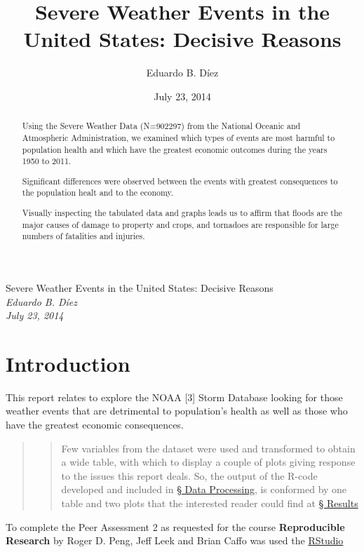 \documentclass[12pt,spanish, american,b4paper, onecolumn, lmargin=1cm, rmargin=1cm, tmargin=1cm, bmargin=2cm,]{article}
\title{Severe Weather Events in the United States: \newline{} Decisive Reasons}
\author{Eduardo B. Díez}
\date{July 23, 2014}
\begin{document}
\begin{center}
\huge Severe Weather Events in the United States: \newline{} Decisive Reasons \\[0.2cm]
\large \emph{Eduardo B. Díez}\\[0.1cm]
\large \emph{July 23, 2014} \\
\normalsize
\end{center}

\renewcommand{\abstractname}{Synopsis}
\begin{abstract}
Using the Severe Weather Data (N=902297) from the National Oceanic and
Atmospheric Administration, we examined which types of events are most
harmful to population health and which have the greatest economic
outcomes during the years 1950 to 2011.

Significant differences were observed between the events with greatest
consequences to the population healt and to the economy.

Visually inspecting the tabulated data and graphs leads us to affirm
that floods are the major causes of damage to property and crops, and
tornadoes are responsible for large numbers of fatalities and injuries.
\end{abstract}

\section{Introduction}\label{introduction}

This report relates to explore the NOAA {[}3{]} Storm Database looking
for those weather events that are detrimental to population's health as
well as those who have the greatest economic consequences.

\begin{quote}
\begin{quote}
Few variables from the dataset were used and transformed to obtain a
wide table, with which to display a couple of plots giving response to
the issues this report deals. So, the output of the R-code developed and
included in \hyperref[datapro]{§ Data Processing}, is conformed by one
table and two plots that the interested reader could find at
\hyperref[results]{§ Results}
\end{quote}
\end{quote}

To complete the Peer Assessment 2 as requested for the course
\textbf{Reproducible Research} by Roger D. Peng, Jeff Leek and Brian
Caffo was used the \href{http://www.rstudio.com/}{RStudio}
\end{document}
